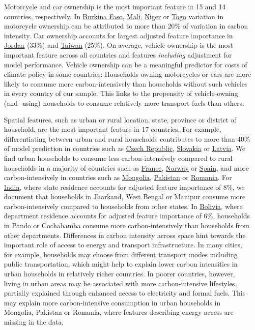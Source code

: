 \documentclass[12pt, a4paper]{article}
\begin{document}
Motorcycle and car ownership is the most important feature in 15 and 14 countries, respectively. In \hyperref[fig:5b_BFA]{Burkina Faso}, \hyperref[fig:5b_MLI]{Mali}, \hyperref[fig:5b_NER]{Niger} or \hyperref[fig:5b_TGO]{Togo} variation in motorcycle ownership can be attributed to more than 20\% of variation in carbon intensity. Car ownership accounts for largest adjusted feature importance in \hyperref[fig:5b_JOR]{Jordan} (33\%) and \hyperref[fig:5b_TWN]{Taiwan} (25\%). On average, vehicle ownership is the most important feature across all countries and features \textit{including} adjustment for model performance. Vehicle ownership can be a meaningful predictor for costs of climate policy in some countries: Households owning motorcycles or cars are more likely to consume more carbon-intensively than households without such vehicles in every country of our sample. This links to the propensity of vehicle-owning (and -using) households to consume relatively more transport fuels than others.

Spatial features, such as urban or rural location, state, province or district of household, are the most important feature in 17 countries. For example, differentiating between urban and rural households contributes to more than 40\% of model prediction in countries such as \hyperref[fig:5b_CZE]{Czech Republic}, \hyperref[fig:5b_SVK]{Slovakia} or \hyperref[fig:5b_LVA]{Latvia}. We find urban households to consume less carbon-intensively compared to rural households in a majority of countries such as \hyperref[fig:5b_FRA]{France}, \hyperref[fig:5b_NOR]{Norway} or \hyperref[fig:5b_ESP]{Spain}, and more carbon-intensively in countries such as \hyperref[fig:5b_MNG]{Mongolia}, \hyperref[fig:5b_PAK]{Pakistan} or \hyperref[fig:5b_ROU]{Romania}. For \hyperref[fig:5b_IND]{India}, where state residence accounts for adjusted feature importance of 8\%, we document that households in Jharkand, West Bengal or Manipur consume more carbon-intensively compared to households from other states. In \hyperref[fig:5b_BOL]{Bolivia}, where department residence accounts for adjusted feature importance of 6\%, households in Pando or Cochabamba consume more carbon-intensively than households from other departments. Differences in carbon intensity across space hint towards the important role of access to energy and transport infrastructure. In many cities, for example, households may choose from different transport modes including public transportation, which might help to explain lower carbon intensities in urban households in relatively richer countries. In poorer countries, however, living in urban areas may be associated with more carbon-intensive lifestyles, partially explained through enhanced access to electricity and formal fuels. This may explain more carbon-intensive consumption in urban households in Mongolia, Pakistan or Romania, where features describing energy access are missing in the data.
\end{document}
